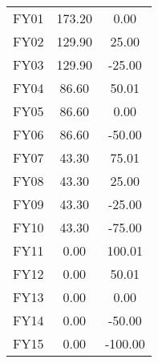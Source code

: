 \documentclass{cumcmthesis}
\begin{document}
\begin{appendices}
\begin{table}[H]
\begin{tabular}{ccc}
		\midrule[1pt]
		FY01&173.20&	0.00\\
		FY02&129.90&	25.00\\
		FY03&129.90&	-25.00\\
		FY04&86.60&	50.01\\
		FY05&86.60&	0.00\\
		FY06&86.60&	-50.00\\
		FY07&43.30&	75.01\\
		FY08&43.30&	25.00\\
		FY09&43.30&	-25.00\\
		FY10&43.30&	-75.00\\
		FY11&0.00&	100.01\\
		FY12&0.00&	50.01\\
		FY13&0.00&	0.00\\
		FY14&0.00&	-50.00\\
		FY15&0.00&	-100.00\\
		

\end{tabular}
\end{table}
\end{appendices}
\end{document}
